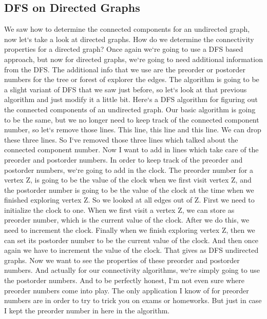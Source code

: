 \subsection{DFS on Directed Graphs}
We saw how to determine the connected components for an undirected graph, now let`s take a look at directed graphs.
How do we determine the connectivity properties for a directed graph? Once again we`re going to use a DFS based approach, but now for directed graphs, we`re going to need additional information from the DFS\@.
The additional info that we use are the preorder or postorder numbers for the tree or forest of explorer the edges.
The algorithm is going to be a slight variant of DFS that we saw just before, so let`s look at that previous algorithm and just modify it a little bit.
Here`s a DFS algorithm for figuring out the connected components of an undirected graph.
Our basic algorithm is going to be the same, but we no longer need to keep track of the connected component number, so let`s remove those lines.
This line, this line and this line.
We can drop these three lines.
So I`ve removed those three lines which talked about the connected component number.
Now I want to add in lines which take care of the preorder and postorder numbers.
In order to keep track of the preorder and postorder numbers, we`re going to add in the clock.
The preorder number for a vertex Z, is going to be the value of the clock when we first visit vertex Z, and the postorder number is going to be the value of the clock at the time when we finished exploring vertex Z\@.
So we looked at all edges out of Z\@.
First we need to initialize the clock to one.
When we first visit a vertex Z, we can store as preorder number, which is the current value of the clock.
After we do this, we need to increment the clock.
Finally when we finish exploring vertex Z, then we can set its postorder number to be the current value of the clock.
And then once again we have to increment the value of the clock.
That gives as DFS undirected graphs.
Now we want to see the properties of these preorder and postorder numbers.
And actually for our connectivity algorithms, we`re simply going to use the postorder numbers.
And to be perfectly honest, I`m not even sure where preorder numbers come into play.
The only application I know of for preorder numbers are in order to try to trick you on exams or homeworks.
But just in case I kept the preorder number in here in the algorithm.

